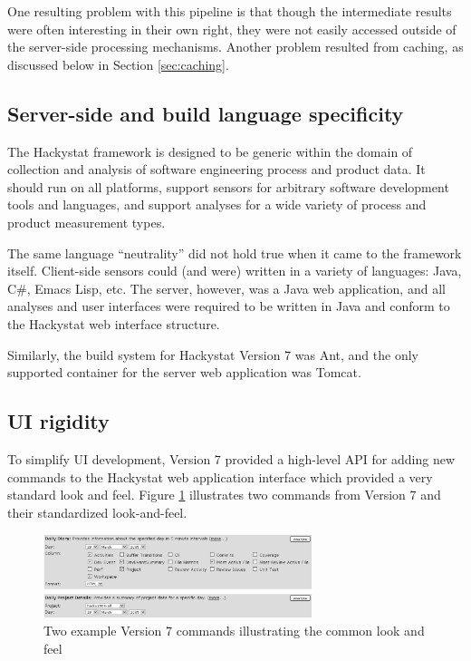 \documentclass[conference,compsoc]{IEEEtran}
\begin{document}
One resulting problem with this pipeline is that though the intermediate
results were often interesting in their own right, they were not easily
accessed outside of the server-side processing mechanisms. Another problem 
resulted from caching, as discussed below in Section \ref{sec:caching}.

\subsection{Server-side and build language specificity}

The Hackystat framework is designed to be generic within the domain of
collection and analysis of software engineering process and product data.
It should run on all platforms, support sensors for arbitrary software
development tools and languages, and support analyses for a wide variety of
process and product measurement types.

The same language ``neutrality'' did not hold true when it came to the
framework itself.  Client-side sensors could (and were) written in a
variety of languages: Java, C\#, Emacs Lisp, etc. The server, however, was
a Java web application, and all analyses and user interfaces were required
to be written in Java and conform to the Hackystat web interface structure.

Similarly, the build system for Hackystat Version 7 was Ant, and the only
supported container for the server web application was Tomcat.

\subsection{UI rigidity}

To simplify UI development, Version 7 provided a high-level API for adding
new commands to the Hackystat web application interface which provided a
very standard look and feel.  Figure \ref{fig:commands} illustrates two
commands from Version 7 and their standardized look-and-feel.

\begin{figure}[ht]
  \center
  \includegraphics[width=0.7\textwidth]{v7commands.eps}
  \caption{Two example Version 7 commands illustrating the common look and feel}
  \label{fig:commands}
\end{figure} 
\end{document}
